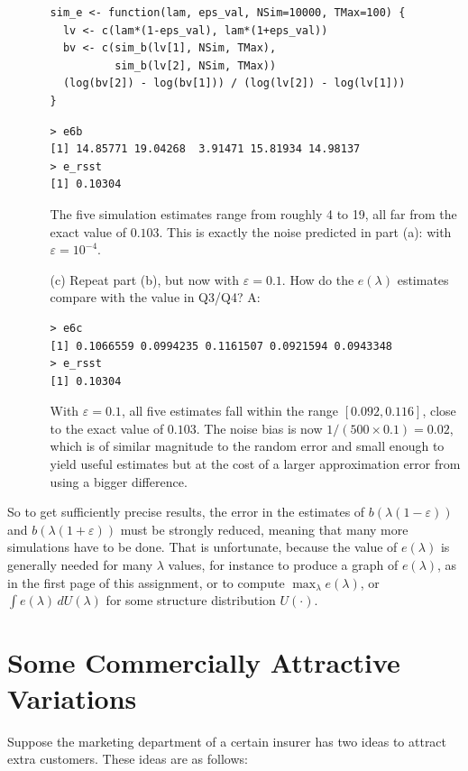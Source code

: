 \documentclass{article}
\begin{document}
\begin{enumerate}
\begin{enumerate}
\begin{lstlisting}
sim_e <- function(lam, eps_val, NSim=10000, TMax=100) {
  lv <- c(lam*(1-eps_val), lam*(1+eps_val))
  bv <- c(sim_b(lv[1], NSim, TMax),
          sim_b(lv[2], NSim, TMax))
  (log(bv[2]) - log(bv[1])) / (log(lv[2]) - log(lv[1]))
}
\end{lstlisting}
\begin{lstlisting}
> e6b
[1] 14.85771 19.04268  3.91471 15.81934 14.98137
> e_rsst
[1] 0.10304
\end{lstlisting}
The five simulation estimates range from roughly 4 to 19, all far from the exact value of $0.103$. This is exactly the noise predicted in part (a): with $\varepsilon = 10^{-4}$.
    
    \item [(c)] Repeat part (b), but now with $\varepsilon = 0.1$. How do the $e(\lambda)$ estimates compare with the value in Q3/Q4? \newline
    A:
\begin{lstlisting}
> e6c
[1] 0.1066559 0.0994235 0.1161507 0.0921594 0.0943348
> e_rsst
[1] 0.10304
\end{lstlisting}
With $\varepsilon = 0.1$, all five estimates fall within the range $[0.092, 0.116]$, close to the exact value of $0.103$. The noise bias is now $1/(500 \times 0.1) = 0.02$, which is of similar magnitude to the random error and small enough to yield useful estimates but at the cost of a larger approximation error from using a bigger difference.
  \end{enumerate}
\end{enumerate}

\clearpage
 
So to get sufficiently precise results, the error in the estimates of $b(\lambda(1 - \varepsilon))$ and $b(\lambda(1 + \varepsilon))$ must be strongly reduced, meaning that many more simulations have to be done. That is unfortunate, because the value of $e(\lambda)$ is generally needed for many $\lambda$ values, for instance to produce a graph of $e(\lambda)$, as in the first page of this assignment, or to compute $\max_\lambda e(\lambda)$, or $\int e(\lambda) \, dU(\lambda)$ for some structure distribution $U(\cdot)$.
 
\section{Some Commercially Attractive Variations}
 
Suppose the marketing department of a certain insurer has two ideas to attract extra customers. These ideas are as follows:
 
\end{document}
